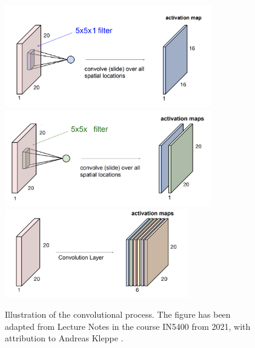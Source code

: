 \documentclass[a4paper, UKenglish, 11pt]{uiomaster}
\begin{document}
\begin{figure}[!htb]
  \centering
  \includegraphics[width=9cm]{figures/Convolutional_operation.png}
  \includegraphics[width=9cm]{figures/conv_operat_2.png}
  \includegraphics[width=8cm]{figures/conv_operat3.png}
  \caption{Illustration of the convolutional process. The figure has been adapted from Lecture Notes in the course IN5400 from 2021, with attribution to Andreas Kleppe \cite{kleppe-lecture}.}
  \label{fig:conv_operations}
\end{figure}

\FloatBarrier

\end{document}
